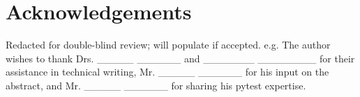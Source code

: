 \section{Acknowledgements}\label{sec:acknowledgements}

Redacted for double-blind review; will populate if accepted.  e.g.
The author wishes to thank Drs. \_\_\_\_\_ \_\_\_\_\_\_ and \_\_\_\_\_\_\_ \_\_\_\_\_\_\_\_
for their assistance in technical writing, Mr. \_\_\_\_\_ \_\_\_\_\_\_
for his input on the abstract, and Mr. \_\_\_\_\_ \_\_\_\_\_\_ for sharing his pytest
expertise.

% 

